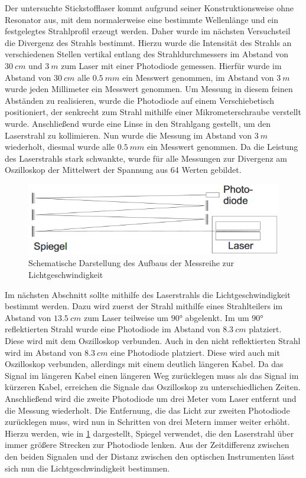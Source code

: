 \documentclass[
	a4paper,
	12pt,
	pagesize,
	ngerman
]{scrartcl}
\begin{document}
Der untersuchte Stickstofflaser kommt aufgrund seiner Konstruktionsweise ohne Resonator aus, mit dem normalerweise eine bestimmte Wellenlänge und ein festgelegtes Strahlprofil erzeugt werden. Daher wurde im nächsten Versuchsteil die Divergenz des Strahls bestimmt. Hierzu wurde die Intensität des Strahls an verschiedenen Stellen vertikal entlang des Strahldurchmessers im Abstand von $\SI{30}{cm}$ und $\SI{3}{m}$ zum Laser mit einer Photodiode gemessen. Hierfür wurde im Abstand von $\SI{30}{cm}$ alle $\SI{0,5}{mm}$ ein Messwert genommen, im Abstand von $\SI{3}{m}$ wurde jeden Millimeter ein Messwert genommen. Um Messung in diesem feinen Abständen zu realisieren, wurde die Photodiode auf einem Verschiebetisch positioniert, der senkrecht zum Strahl mithilfe einer Mikrometerschraube verstellt wurde.
Anschließend wurde eine Linse in den Strahlgang gestellt, um den Laserstrahl zu kollimieren. Nun wurde die Messung im Abstand von $\SI{3}{m}$ wiederholt, diesmal wurde alle $\SI{0,5}{mm}$ ein Messwert genommen. Da die Leistung des Laserstrahls stark schwankte, wurde für alle Messungen zur Divergenz am Oszilloskop der Mittelwert der Spannung aus 64 Werten gebildet.

\begin{figure}[h!]
	\centering
	\includegraphics[scale=0.9]{skizze_c.png}
	\caption{Schematische Darstellung des Aufbaus der Messreihe zur Lichtgeschwindigkeit}
	\label{skizze_c}
\end{figure}

Im nächsten Abschnitt sollte mithilfe des Laserstrahls die Lichtgeschwindigkeit bestimmt werden. Dazu wird zuerst der Strahl mithilfe eines Strahlteilers im Abstand von $\SI{13,5}{cm}$ zum Laser teilweise um $90$° abgelenkt. Im um $90$° reflektierten Strahl wurde eine Photodiode im Abstand von $\SI{8,3}{cm}$ platziert. Diese wird mit dem Oszilloskop verbunden. Auch in den nicht reflektierten Strahl wird im Abstand von $\SI{8,3}{cm}$ eine Photodiode platziert. Diese wird auch mit Oszilloskop verbunden, allerdings mit einem deutlich längeren Kabel. Da das Signal im längeren Kabel einen längeren Weg zurücklegen muss als das Signal im kürzeren Kabel, erreichen die Signale das Oszilloskop zu unterschiedlichen Zeiten.
Anschließend wird die zweite Photodiode um drei Meter vom Laser entfernt und die Messung wiederholt. Die Entfernung, die das Licht zur zweiten Photodiode zurücklegen muss, wird nun in Schritten von drei Metern immer weiter erhöht. Hierzu werden, wie in \cref{skizze_c} dargestellt, Spiegel verwendet, die den Laserstrahl über immer größere Strecken zur Photodiode lenken.
Aus der Zeitdifferenz zwischen den beiden Signalen und der Distanz zwischen den optischen Instrumenten lässt sich nun die Lichtgeschwindigkeit bestimmen.
\end{document}
